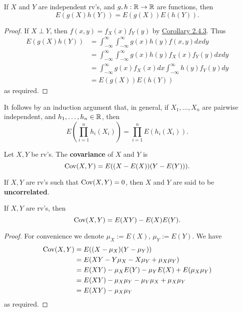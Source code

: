 \documentclass[11pt,fleqn]{book} %
\begin{document}
\begin{theorem} \label{thm:264}
If \(X\) and \(Y\) are independent rv's, and \(g, h: \mathbb{R} \rightarrow \mathbb{R}\) are functions, then
\[
E(g(X)h(Y)) = E(g(X))E(h(Y)).
\]
\end{theorem}
\begin{proof} If \(X \perp Y\), then \(f(x, y) = f_X(x)f_Y(y)\) by \hyperref[cor:243]{Corollary 2.4.3}. Thus
\[
\begin{aligned}
E(g(X)h(Y)) &= \int_{-\infty}^\infty\int_{-\infty}^\infty g(x)h(y)f(x, y) dxdy \\
&= \int_{-\infty}^\infty\int_{-\infty}^\infty g(x)h(y) f_X(x)f_Y(y)dxdy \\
&= \int_{-\infty}^\infty g(x)f_X(x)dx \int_{-\infty}^\infty h(y)f_Y(y)dy \\
&= E(g(X))E(h(Y))
\end{aligned}
\]
as required.
\end{proof}

\begin{remark} \label{rmk:265}
It follows by an induction argument that, in general, if \(X_1, \ldots, X_n\) are pairwise independent, and \(h_1, \ldots, h_n\in \mathbb{R}\), then
\[
E\left(\prod_{i=1}^n h_i(X_i)\right) = \prod_{i=1}^nE(h_i(X_i)).
\]
\end{remark}

\begin{definition} \label{def:266}
Let \(X, Y\) be rv's. The \textbf{covariance} of \(X\) and \(Y\) is
\[
\operatorname{Cov}(X, Y) = E((X - E(X))(Y - E(Y))).
\]
\end{definition}

\begin{definition} \label{def:267}
If \(X, Y\) are rv's such that \(\operatorname{Cov}(X, Y) = 0\), then \(X\) and \(Y\) are said to be \textbf{uncorrelated}.
\end{definition}

\begin{theorem} \label{thm:268}
If \(X, Y\) are rv's, then
\[
\operatorname{Cov}(X, Y) = E(XY) - E(X)E(Y).
\]
\end{theorem}
\begin{proof} For convenience we denote \(\mu_X := E(X)\), \(\mu_Y := E(Y)\). We have
\[
\begin{aligned}
\operatorname{Cov}(X, Y) &= E((X - \mu_X)(Y - \mu_Y)) \\
&= E(XY - Y\mu_X - X\mu_Y + \mu_X\mu_Y) \\
&= E(XY) - \mu_XE(Y) - \mu_YE(X) + E(\mu_X\mu_Y) \\
&= E(XY) - \mu_X\mu_Y - \mu_Y\mu_X + \mu_X\mu_Y \\
&= E(XY) - \mu_X\mu_Y
\end{aligned}
\]
as required.
\end{proof}
\end{document}
